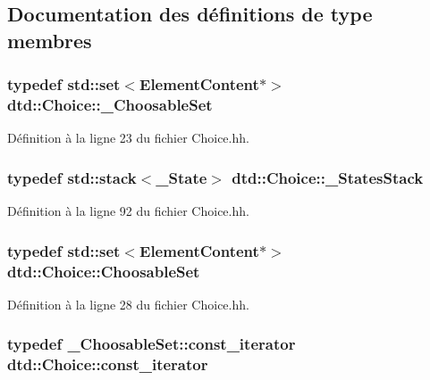 \subsection{Documentation des définitions de type membres}
\hypertarget{classdtd_1_1_choice_a07352a0a4e78923e41370e6b00af1c86}{
\subsubsection[{\_\-ChoosableSet}]{\setlength{\rightskip}{0pt plus 5cm}typedef std::set$<${\bf ElementContent}$\ast$$>$ {\bf dtd::Choice::\_\-ChoosableSet}}}
\label{classdtd_1_1_choice_a07352a0a4e78923e41370e6b00af1c86}


Définition à la ligne 23 du fichier Choice.hh.

\hypertarget{classdtd_1_1_choice_a804cc83d915d4a96b04a850cf99b7b51}{
\subsubsection[{\_\-StatesStack}]{\setlength{\rightskip}{0pt plus 5cm}typedef std::stack$<${\bf \_\-State}$>$ {\bf dtd::Choice::\_\-StatesStack}}}
\label{classdtd_1_1_choice_a804cc83d915d4a96b04a850cf99b7b51}


Définition à la ligne 92 du fichier Choice.hh.

\hypertarget{classdtd_1_1_choice_af9629ca325eb99da3f274b2ad3dc2060}{
\subsubsection[{ChoosableSet}]{\setlength{\rightskip}{0pt plus 5cm}typedef std::set$<${\bf ElementContent}$\ast$$>$ {\bf dtd::Choice::ChoosableSet}}}
\label{classdtd_1_1_choice_af9629ca325eb99da3f274b2ad3dc2060}


Définition à la ligne 28 du fichier Choice.hh.

\hypertarget{classdtd_1_1_choice_a127d277a680fe88ae37034deeefbfca4}{
\subsubsection[{const\_\-iterator}]{\setlength{\rightskip}{0pt plus 5cm}typedef \_\-ChoosableSet::const\_\-iterator {\bf dtd::Choice::const\_\-iterator}}}
\label{classdtd_1_1_choice_a127d277a680fe88ae37034deeefbfca4}


